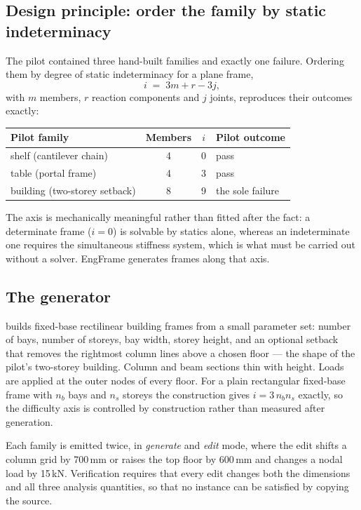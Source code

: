 \documentclass[11pt,a4paper]{article}
\newcommand{\code}[1]{\path{#1}}
\begin{document}
\subsection{Design principle: order the family by static indeterminacy}

The pilot contained three hand-built families and exactly one failure. Ordering them by degree of static
indeterminacy for a plane frame,
\[
i \;=\; 3m + r - 3j,
\]
with $m$ members, $r$ reaction components and $j$ joints, reproduces their outcomes exactly:

\begin{center}
\begin{tabular}{lccl}
\toprule
Pilot family & Members & $i$ & Pilot outcome \\
\midrule
shelf (cantilever chain) & 4 & 0 & pass \\
table (portal frame) & 4 & 3 & pass \\
building (two-storey setback) & 8 & 9 & the sole failure \\
\bottomrule
\end{tabular}
\end{center}

The axis is mechanically meaningful rather than fitted after the fact: a determinate frame ($i = 0$)
is solvable by statics alone, whereas an indeterminate one requires the simultaneous stiffness system,
which is what must be carried out without a solver. EngFrame generates frames along that axis.

\subsection{The generator}

\code{scripts/eng_frame_bench.py} builds fixed-base rectilinear building frames from a small parameter
set: number of bays, number of storeys, bay width, storey height, and an optional setback that removes
the rightmost column lines above a chosen floor --- the shape of the pilot's two-storey building. Column
and beam sections thin with height. Loads are applied at the outer nodes of every floor. For a plain
rectangular fixed-base frame with $n_b$ bays and $n_s$ storeys the construction gives $i = 3\,n_b n_s$
exactly, so the difficulty axis is controlled by construction rather than measured after generation.

Each family is emitted twice, in \emph{generate} and \emph{edit} mode, where the edit shifts a column
grid by 700\,mm or raises the top floor by 600\,mm and changes a nodal load by 15\,kN. Verification
requires that every edit changes both the dimensions and all three analysis quantities, so that no
instance can be satisfied by copying the source.
\end{document}
